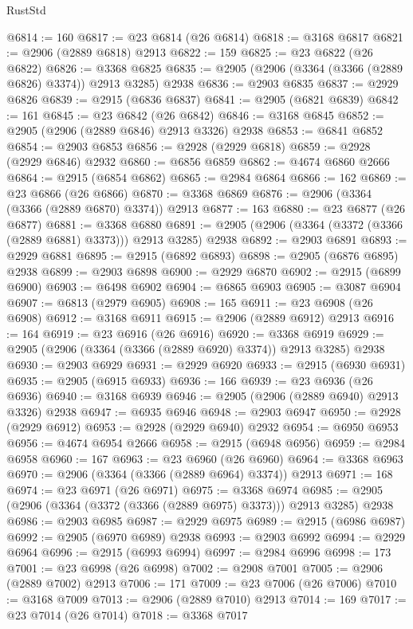 \begin{lexlean}{RustStd}
\begin{coremodule}
@6814 := 160
@6817 := @23 @6814 (@26 @6814)
@6818 := @3168 @6817
@6821 := @2906 (@2889 @6818) @2913
@6822 := 159
@6825 := @23 @6822 (@26 @6822)
@6826 := @3368 @6825
@6835 := @2905 (@2906 (@3364 (@3366 (@2889 @6826) @3374)) @2913 @3285) @2938
@6836 := @2903 @6835
@6837 := @2929 @6826
@6839 := @2915 (@6836 @6837)
@6841 := @2905 (@6821 @6839)
@6842 := 161
@6845 := @23 @6842 (@26 @6842)
@6846 := @3168 @6845
@6852 := @2905 (@2906 (@2889 @6846) @2913 @3326) @2938
@6853 := @6841 @6852
@6854 := @2903 @6853
@6856 := @2928 (@2929 @6818)
@6859 := @2928 (@2929 @6846) @2932
@6860 := @6856 @6859
@6862 := @4674 @6860 @2666
@6864 := @2915 (@6854 @6862)
@6865 := @2984 @6864
@6866 := 162
@6869 := @23 @6866 (@26 @6866)
@6870 := @3368 @6869
@6876 := @2906 (@3364 (@3366 (@2889 @6870) @3374)) @2913
@6877 := 163
@6880 := @23 @6877 (@26 @6877)
@6881 := @3368 @6880
@6891 := @2905 (@2906 (@3364 (@3372 (@3366 (@2889 @6881) @3373))) @2913 @3285) @2938
@6892 := @2903 @6891
@6893 := @2929 @6881
@6895 := @2915 (@6892 @6893)
@6898 := @2905 (@6876 @6895) @2938
@6899 := @2903 @6898
@6900 := @2929 @6870
@6902 := @2915 (@6899 @6900)
@6903 := @6498 @6902
@6904 := @6865 @6903
@6905 := @3087 @6904
@6907 := @6813 (@2979 @6905)
@6908 := 165
@6911 := @23 @6908 (@26 @6908)
@6912 := @3168 @6911
@6915 := @2906 (@2889 @6912) @2913
@6916 := 164
@6919 := @23 @6916 (@26 @6916)
@6920 := @3368 @6919
@6929 := @2905 (@2906 (@3364 (@3366 (@2889 @6920) @3374)) @2913 @3285) @2938
@6930 := @2903 @6929
@6931 := @2929 @6920
@6933 := @2915 (@6930 @6931)
@6935 := @2905 (@6915 @6933)
@6936 := 166
@6939 := @23 @6936 (@26 @6936)
@6940 := @3168 @6939
@6946 := @2905 (@2906 (@2889 @6940) @2913 @3326) @2938
@6947 := @6935 @6946
@6948 := @2903 @6947
@6950 := @2928 (@2929 @6912)
@6953 := @2928 (@2929 @6940) @2932
@6954 := @6950 @6953
@6956 := @4674 @6954 @2666
@6958 := @2915 (@6948 @6956)
@6959 := @2984 @6958
@6960 := 167
@6963 := @23 @6960 (@26 @6960)
@6964 := @3368 @6963
@6970 := @2906 (@3364 (@3366 (@2889 @6964) @3374)) @2913
@6971 := 168
@6974 := @23 @6971 (@26 @6971)
@6975 := @3368 @6974
@6985 := @2905 (@2906 (@3364 (@3372 (@3366 (@2889 @6975) @3373))) @2913 @3285) @2938
@6986 := @2903 @6985
@6987 := @2929 @6975
@6989 := @2915 (@6986 @6987)
@6992 := @2905 (@6970 @6989) @2938
@6993 := @2903 @6992
@6994 := @2929 @6964
@6996 := @2915 (@6993 @6994)
@6997 := @2984 @6996
@6998 := 173
@7001 := @23 @6998 (@26 @6998)
@7002 := @2908 @7001
@7005 := @2906 (@2889 @7002) @2913
@7006 := 171
@7009 := @23 @7006 (@26 @7006)
@7010 := @3168 @7009
@7013 := @2906 (@2889 @7010) @2913
@7014 := 169
@7017 := @23 @7014 (@26 @7014)
@7018 := @3368 @7017

\end{coremodule}
\end{lexlean}
